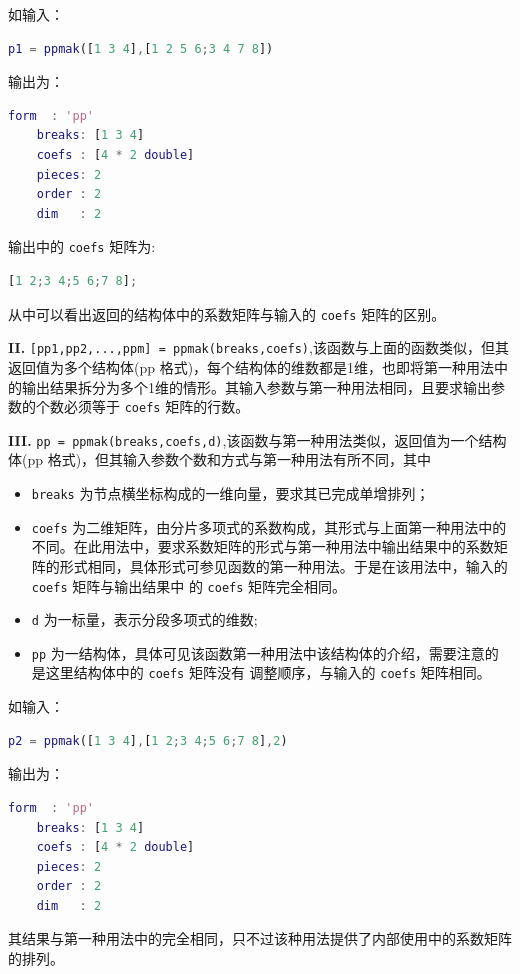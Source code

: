 如输入：
\begin{lstlisting}[language = matlab]
    p1 = ppmak([1 3 4],[1 2 5 6;3 4 7 8])
\end{lstlisting}

输出为：
\begin{lstlisting}[language = matlab ]
    form  : 'pp'
    breaks: [1 3 4]
    coefs : [4 * 2 double]
    pieces: 2
    order : 2
    dim   : 2
\end{lstlisting}

输出中的 \texttt{coefs} 矩阵为:
\begin{lstlisting}[language = matlab ]
    [1 2;3 4;5 6;7 8];
\end{lstlisting}

从中可以看出返回的结构体中的系数矩阵与输入的 \texttt{coefs} 矩阵的区别。

\textbf{II.}  \texttt{[pp1,pp2,...,ppm] = ppmak(breaks,coefs)},该函数与上面的函数类似，但其返回值为多个结构体(pp 格式)，每个结构体的维数都是1维，也即将第一种用法中的输出结果拆分为多个1维的情形。其输入参数与第一种用法相同，且要求输出参数的个数必须等于
\texttt{coefs} 矩阵的行数。

\textbf{III.}  \texttt{pp = ppmak(breaks,coefs,d)},该函数与第一种用法类似，返回值为一个结构体(pp 格式)，但其输入参数个数和方式与第一种用法有所不同，其中
\begin{itemize}
    \item \texttt{breaks} 为节点横坐标构成的一维向量，要求其已完成单增排列；
    \item \texttt{coefs} 为二维矩阵，由分片多项式的系数构成，其形式与上面第一种用法中的不同。在此用法中，要求系数矩阵的形式与第一种用法中输出结果中的系数矩阵的形式相同，具体形式可参见函数的第一种用法。于是在该用法中，输入的 \texttt{coefs} 矩阵与输出结果中
          的 \texttt{coefs} 矩阵完全相同。
    \item \texttt{d} 为一标量，表示分段多项式的维数;
    \item \texttt{pp} 为一结构体，具体可见该函数第一种用法中该结构体的介绍，需要注意的是这里结构体中的 \texttt{coefs} 矩阵没有
          调整顺序，与输入的 \texttt{coefs} 矩阵相同。
\end{itemize}

如输入：
\begin{lstlisting}[language = matlab]
    p2 = ppmak([1 3 4],[1 2;3 4;5 6;7 8],2)
\end{lstlisting}

输出为：
\begin{lstlisting}[language = matlab ]
    form  : 'pp'
    breaks: [1 3 4]
    coefs : [4 * 2 double]
    pieces: 2
    order : 2
    dim   : 2
\end{lstlisting}

其结果与第一种用法中的完全相同，只不过该种用法提供了内部使用中的系数矩阵的排列。
